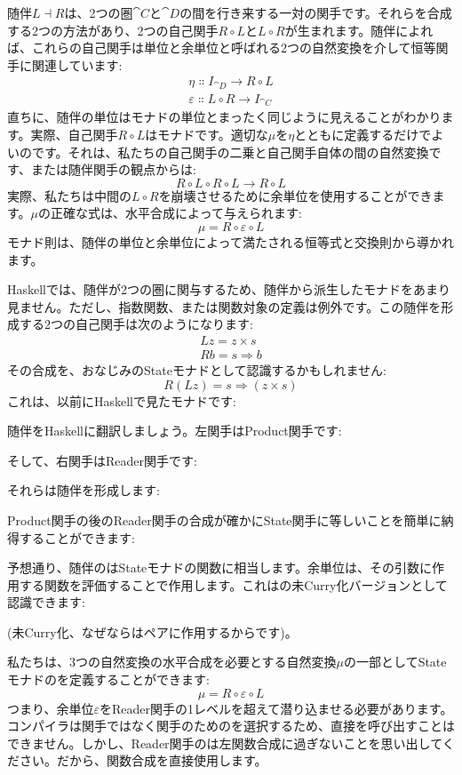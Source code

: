 随伴$L \dashv R$は、2つの圏$\cat{C}$と$\cat{D}$の間を行き来する一対の関手です。それらを合成する2つの方法があり、2つの自己関手$R \circ L$と$L \circ R$が生まれます。随伴によれば、これらの自己関手は単位と余単位と呼ばれる2つの自然変換を介して恒等関手に関連しています: 
\begin{gather*}
  \eta \Colon I_{\cat{D}} \to R \circ L \\
  \varepsilon \Colon L \circ R \to I_{\cat{C}}
\end{gather*}
直ちに、随伴の単位はモナドの単位とまったく同じように見えることがわかります。実際、自己関手$R \circ L$はモナドです。適切な$\mu$を$\eta$とともに定義するだけでよいのです。それは、私たちの自己関手の二乗と自己関手自体の間の自然変換です、または随伴関手の観点からは: 
\[R \circ L \circ R \circ L \to R \circ L\]
実際、私たちは中間の$L \circ R$を崩壊させるために余単位を使用することができます。$\mu$の正確な式は、水平合成によって与えられます: 
\[\mu = R \circ \varepsilon \circ L\]
モナド則は、随伴の単位と余単位によって満たされる恒等式と交換則から導かれます。

Haskellでは、随伴が2つの圏に関与するため、随伴から派生したモナドをあまり見ません。ただし、指数関数、または関数対象の定義は例外です。この随伴を形成する2つの自己関手は次のようになります: 
\begin{gather*}
  L z = z\times{}s \\
  R b = s \Rightarrow b
\end{gather*}
その合成を、おなじみのStateモナドとして認識するかもしれません: 
\[R (L z) = s \Rightarrow (z\times{}s)\]
これは、以前にHaskellで見たモナドです: 

随伴をHaskellに翻訳しましょう。左関手はProduct関手です: 

そして、右関手はReader関手です: 

それらは随伴を形成します: 

Product関手の後のReader関手の合成が確かにState関手に等しいことを簡単に納得することができます: 

予想通り、随伴のはStateモナドの関数に相当します。余単位は、その引数に作用する関数を評価することで作用します。これはの未Curry化バージョンとして認識できます: 

(未Curry化、なぜならはペアに作用するからです)。

私たちは、3つの自然変換の水平合成を必要とする自然変換$\mu$の一部としてStateモナドのを定義することができます: 
\[\mu = R \circ \varepsilon \circ L\]
つまり、余単位$\varepsilon$をReader関手の1レベルを超えて潜り込ませる必要があります。コンパイラは関手ではなく関手のためのを選択するため、直接を呼び出すことはできません。しかし、Reader関手のは左関数合成に過ぎないことを思い出してください。だから、関数合成を直接使用します。


